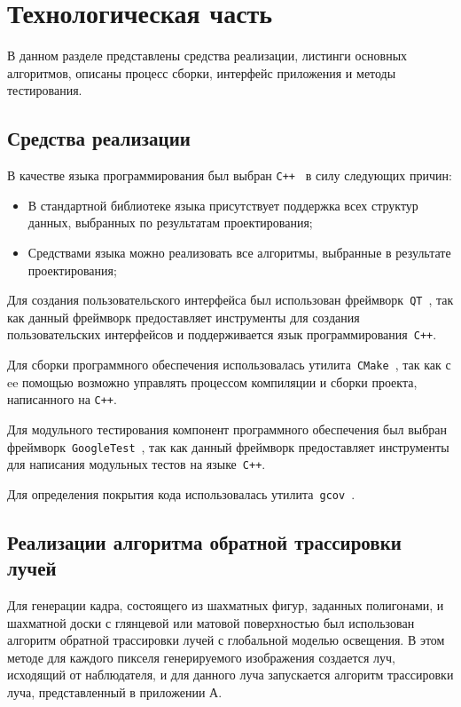 \chapter{Технологическая часть}

В данном разделе представлены средства реализации, листинги основных алгоритмов, описаны процесс сборки, интерфейс приложения и методы тестирования.

\section{Средства реализации}
В качестве языка программирования был выбран \texttt{C++}~\cite{cpp} в силу следующих причин:
\begin{itemize}
	\item В стандартной библиотеке языка присутствует поддержка всех структур данных, выбранных по результатам проектирования;
	\item Средствами языка можно реализовать все алгоритмы, выбранные в результате проектирования;
\end{itemize}

Для создания пользовательского интерфейса был использован фреймворк~\texttt{QT}~\cite{qt}, так как данный фреймворк предоставляет инструменты для создания пользовательских интерфейсов и поддерживается язык программирования~\texttt{C++}.

Для сборки программного обеспечения использовалась утилита~\texttt{CMake}~\cite{cmake}, так как с ee помощью возможно управлять процессом компиляции и сборки проекта, написанного на \texttt{C++}.

Для модульного тестирования компонент программного обеспечения был выбран фреймворк~\texttt{GoogleTest}~\cite{gtest}, так как данный фреймворк предоставляет инструменты для написания модульных тестов на языке~\texttt{C++}.

Для определения покрытия кода использовалась утилита~\texttt{gcov}~\cite{gcov}.

\clearpage
\section{Реализации алгоритма обратной трассировки лучей}

Для генерации кадра, состоящего из шахматных фигур, заданных полигонами, и шахматной доски с глянцевой или матовой поверхностью был использован алгоритм обратной трассировки лучей с глобальной моделью освещения. В этом методе для каждого пикселя генерируемого изображения создается луч, исходящий от наблюдателя, и для данного луча запускается алгоритм трассировки луча, представленный в приложении А. 

